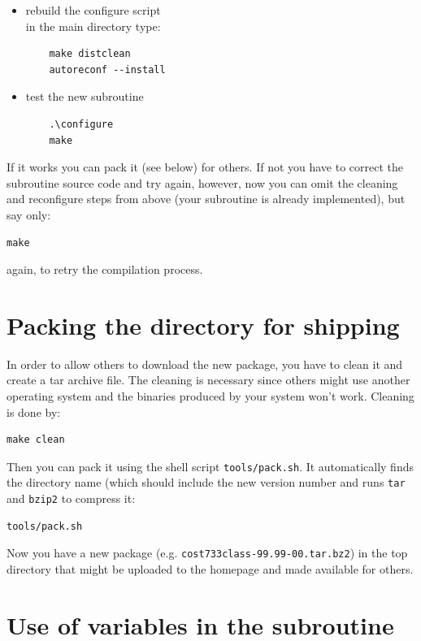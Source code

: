 \documentclass[12pt, oneside, a4paper, headsepline, plainheadsepline]{scrbook}
\begin{document}
\begin{itemize}
\item rebuild the configure script \\
	in the main directory type:
	\begin{lstlisting}
	make distclean
	autoreconf --install
	\end{lstlisting}	

\item test the new subroutine \vspace{1em}
    \begin{lstlisting}
	.\configure
	make
	\end{lstlisting}	
	
\end{itemize}

If it works you can pack it (see below) for others. If not you have to correct the subroutine source code and try again, 
however, now you can omit the cleaning and reconfigure steps from above (your subroutine is already implemented), but say only:
\begin{lstlisting}
make
\end{lstlisting}
again, to retry the compilation process.


\section{Packing the directory for shipping}

In order to allow others to download the new package, you have to clean it and create a tar archive file.
The cleaning is necessary since others might use another operating system and the binaries produced by your system won't work.
Cleaning is done by:
\begin{lstlisting}
make clean
\end{lstlisting}
Then you can pack it using the shell script \verb+tools/pack.sh+. It automatically finds the directory name (which should include the
new version number and runs \verb+tar+ and \verb+bzip2+ to compress it:
\begin{lstlisting}
tools/pack.sh
\end{lstlisting}
Now you have a new package (e.g. \verb+cost733class-99.99-00.tar.bz2+) in the top directory 
that might be uploaded to the homepage and made available for others.


\section{Use of variables in the subroutine}
\end{document}
